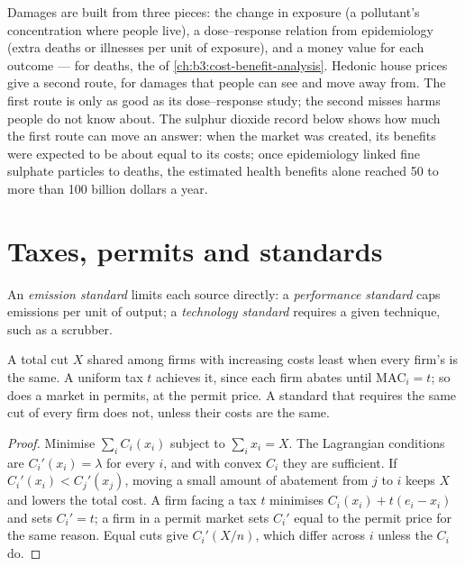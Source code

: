 \begin{measure}
Damages are built from three pieces: the change in exposure (a pollutant's
concentration where people live), a dose--response relation from epidemiology
(extra deaths or illnesses per unit of exposure), and a money value for each
outcome --- for deaths, the  of
\cref{ch:b3:cost-benefit-analysis}. Hedonic house prices give a second route, for
damages that people can see and move away from. The first route is only as good as
its dose--response study; the second misses harms people do not know about.
The sulphur dioxide record below shows how much the first route can move an answer:
when the market was created, its benefits were expected to be about equal to its
costs; once epidemiology linked fine sulphate particles to deaths, the estimated
health benefits alone reached 50 to more than 100 billion dollars a year.
\end{measure}

\section{Taxes, permits and standards}\label{sec:b3:environmental-and-resource-economics:instruments}

\begin{definition}\label{def:b3:environmental-and-resource-economics:standard}
An \emph{emission standard} limits each source directly: a \emph{performance
standard} caps emissions per unit of output; a \emph{technology standard} requires a
given technique, such as a scrubber.
\end{definition}

\begin{proposition}\label{prop:b3:environmental-and-resource-economics:equal-mac}
A total cut $X$ shared among firms with increasing  costs least when every
firm's  is the same. A uniform tax $t$ achieves it, since each firm
abates until $\mathrm{MAC}_i = t$; so does a market in permits, at the permit price. A standard that requires
the same cut of every firm does not, unless their costs are the same.
\end{proposition}

\begin{proof}
Minimise $\sum_i C_i(x_i)$ subject to $\sum_i x_i = X$. The Lagrangian conditions are $C_i'(x_i) = \lambda$ for every $i$, and with convex $C_i$
they are sufficient. If $C_i'(x_i) < C_j'(x_j)$, moving a small amount of abatement from $j$ to $i$ keeps $X$ and lowers the
total cost. A firm facing a tax $t$ minimises $C_i(x_i) + t(e_i - x_i)$ and sets $C_i' = t$; a firm in a permit market sets $C_i'$ equal to
the permit price for the same reason. Equal cuts give $C_i'(X/n)$, which differ across $i$ unless the $C_i$ do.
\end{proof}

